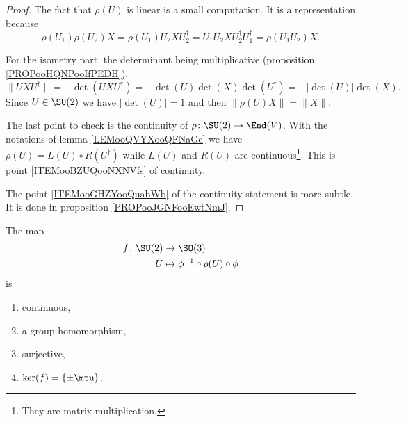 \begin{proof}
    The fact that \( \rho(U)\) is linear is a small computation. It is a representation because
    \begin{equation}
        \rho(U_1)\rho(U_2)X=\rho(U_1)U_2XU_2^{\dag}=U_1U_2XU_2^{\dag}U_1^{\dag}=\rho(U_1U_2)X.
    \end{equation}
    
    For the isometry part, the determinant being multiplicative (proposition \ref{PROPooHQNPooIfPEDH}),
    \begin{equation}
        \| UXU^{\dag} \|=-\det(UXU^{\dag})=-\det(U)\det(X)\det(U^{\dag})=-| \det(U) |\det(X).
    \end{equation}
    Since \( U\in\SU(2)\) we have \( | \det(U) |=1\) and then \( \| \rho(U)X \|=\| X \|\).

    The last point to check is the continuity of \( \rho\colon \SU(2)\to \End(V)\). With the notations of lemma \ref{LEMooQVYXooQFNaGc} we have \( \rho(U)=L(U)\circ R(U^{\dag})\) while \( L(U)\) and \( R(U)\) are continuous\footnote{They are matrix multiplication.}. This is point \ref{ITEMooBZUQooNXNVfs} of continuity.

    The point \ref{ITEMooGHZYooQuabWb} of the continuity statement is more subtle. It is done in proposition \ref{PROPooJGNFooEwtNmJ}.
\end{proof}

\begin{proposition}     \label{PROPooGEHAooPCReoU}
    The map
    \begin{equation}
        \begin{aligned}
            f\colon \SU(2)&\to \SO(3) \\
            U&\mapsto \phi^{-1}\circ \rho(U)\circ\phi 
        \end{aligned}
    \end{equation}
    is
    \begin{enumerate}
        \item
            continuous,
        \item
            a group homomorphism,
        \item
            surjective,
        \item
            \( \ker(f)=\{ \pm \mtu \}\).
    \end{enumerate}
\end{proposition}

